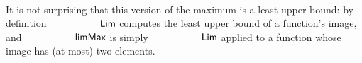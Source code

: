       \begin{code}%
%
\>[4]\AgdaSpace{}%
\AgdaSymbol{:}\AgdaSpace{}%
\AgdaSpace{}%
\AgdaSymbol{\{}\AgdaSpace{}%
\AgdaSpace{}%
\AgdaSpace{}%
\AgdaSymbol{\}}\<%
\\
\>[4][@{}l@{\AgdaIndent{0}}]%
\>[8]\AgdaSpace{}%
\AgdaSpace{}%
\AgdaSpace{}%
\AgdaSpace{}%
\AgdaSpace{}%
\AgdaSpace{}%
\AgdaSpace{}%
\<%
\\
%
\>[8]\AgdaSpace{}%
\AgdaSpace{}%
\AgdaSpace{}%
\AgdaSpace{}%
\AgdaSpace{}%
\AgdaSpace{}%
\AgdaSpace{}%
\<%
\\
%
\\[\AgdaEmptyExtraSkip]%
%
\>[4]\AgdaSpace{}%
\AgdaSymbol{:}\AgdaSpace{}%
\AgdaSpace{}%
\AgdaSymbol{\{}\AgdaSpace{}%
\AgdaSymbol{\}}\AgdaSpace{}%
\AgdaSpace{}%
\AgdaSpace{}%
\AgdaSpace{}%
\AgdaSpace{}%
\AgdaSpace{}%
\AgdaSpace{}%
\AgdaSpace{}%
\<%
\\
%
\\[\AgdaEmptyExtraSkip]%
%
\>[4]\AgdaSpace{}%
\AgdaSymbol{:}\AgdaSpace{}%
\AgdaSpace{}%
\AgdaSymbol{\{}\AgdaSpace{}%
\AgdaSpace{}%
\AgdaSymbol{\}}\AgdaSpace{}%
\AgdaSpace{}%
\AgdaSpace{}%
\AgdaSpace{}%
\AgdaSpace{}%
\AgdaSpace{}%
\AgdaSpace{}%
\AgdaSpace{}%
\AgdaSpace{}%
\AgdaSpace{}%
\AgdaSpace{}%
\AgdaSpace{}%
\AgdaSpace{}%
\AgdaSpace{}%
\<%
\end{code}
  It is not surprising that this version of the maximum is a least upper bound:
  by definition $\Lim$ computes the least upper bound of a function's image,
  and $\limMax$ is simply $\Lim$ applied to a function whose image has (at most) two elements.

